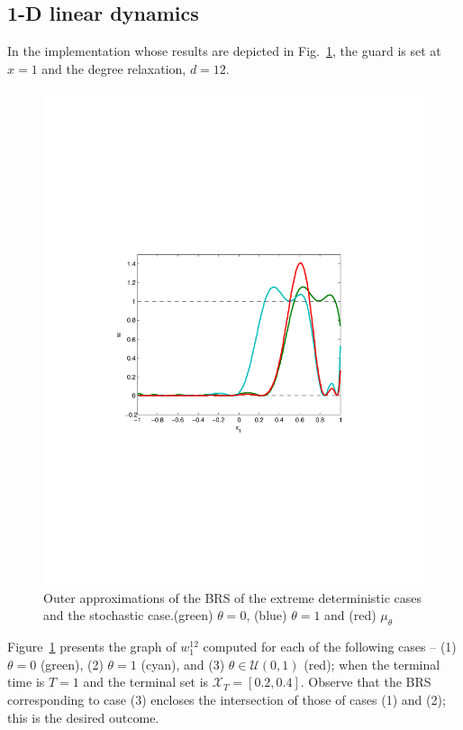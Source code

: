   \subsection{1-D linear dynamics}
In the implementation whose results are depicted in Fig.~\ref{fig:1D:linear}, the guard is set at $x=1$ and the degree relaxation, $d=12$.
\begin{figure}[!t]
  \includegraphics[width=\columnwidth,trim =1.5in 3.3in 1.5in 3.5in, clip=true]{figures/1D_3}
  \caption{Outer approximations of the BRS of the extreme deterministic cases and the stochastic case.(green) $\theta=0$, (blue) $\theta=1$ and (red) $\mu_\theta$}
    \label{fig:1D:linear}
\end{figure}
\par
Figure~\ref{fig:1D:linear} presents the graph of $w_1^{12}$ computed for each of the following cases -- (1) $\theta=0$ (green), (2) $\theta=1$ (cyan), and (3) $\theta\in \mathcal U(0,1)$ (red); when the terminal time is $T=1$ and the terminal set is $\mathcal X_T=[0.2,0.4]$. Observe that the BRS corresponding to case (3) encloses the intersection of those of cases (1) and (2); this is the desired outcome.
